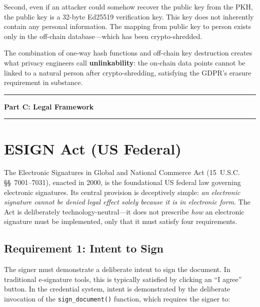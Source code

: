 Second, even if an attacker could somehow recover the public key from the
PKH, the public key is a 32-byte Ed25519 verification key.  This key does
not inherently contain any personal information.  The mapping from public
key to person exists only in the off-chain database---which has been
crypto-shredded.

The combination of one-way hash functions and off-chain key destruction
creates what privacy engineers call \textbf{unlinkability}: the on-chain
data points cannot be linked to a natural person after crypto-shredding,
satisfying the GDPR's erasure requirement in substance.



\vspace{0.5cm}
\noindent\rule{\textwidth}{1.2pt}
\begin{center}
  {\Large\sffamily\bfseries Part C: Legal Framework}
\end{center}
\noindent\rule{\textwidth}{1.2pt}
\vspace{0.3cm}


\section{ESIGN Act (US Federal)}
\label{sec:esign}

The Electronic Signatures in Global and National Commerce Act (15~U.S.C.
\S\S~7001--7031), enacted in 2000, is the foundational US federal law
governing electronic signatures.  Its central provision is deceptively
simple: \emph{an electronic signature cannot be denied legal effect solely
because it is in electronic form}.  The Act is deliberately
technology-neutral---it does not prescribe \emph{how} an electronic
signature must be implemented, only that it must satisfy four requirements.

\subsection{Requirement 1: Intent to Sign}

The signer must demonstrate a deliberate intent to sign the document.  In
traditional e-signature tools, this is typically satisfied by clicking an
``I agree'' button.  In the credential system, intent is demonstrated by
the deliberate invocation of the \texttt{sign\_document()} function, which
requires the signer to:

